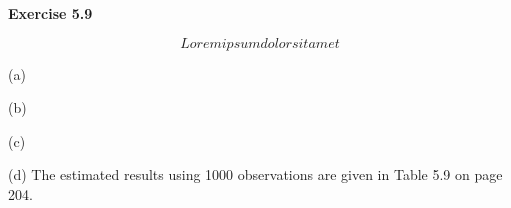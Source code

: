 \documentclass{homework}
\begin{document}
\maketitle


\begin{homeworkProblem} \vspace{-5pt}
{\bf  Exercise 5.9}

\lipsum[1] %

$$Lorem ipsum dolor sit amet$$

\vspace{-5pt} \begin{homeworkSection}{(a)} \vspace{-5pt}
 \lipsum[2]

\problemAnswer{ 
} \end{homeworkSection} \vspace{-15pt}

\begin{homeworkSection}{(b)} \vspace{-5pt}
\lipsum[3]

\problemAnswer{ 
} \end{homeworkSection} \vspace{-15pt}

\begin{homeworkSection}{(c)} \vspace{-5pt}
\lipsum[9]

\problemAnswer{ 
} \end{homeworkSection} \vspace{-15pt}

\begin{homeworkSection}{(d)} \vspace{-5pt}
The estimated results using 1000 observations are given in Table 5.9 on page 204. 

\problemAnswer{ 
\lipsum[10]
} \end{homeworkSection}

\end{homeworkProblem}

\end{document}
